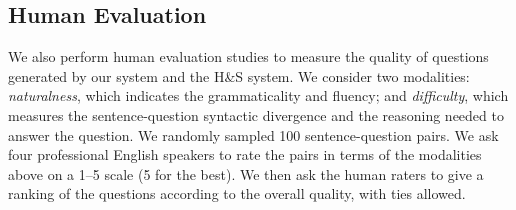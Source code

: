 \documentclass[11pt,a4paper]{article}
\begin{document}


\subsection{Human Evaluation}


We also perform human evaluation studies to measure the quality of questions generated by our system and the H\&S system. We consider two modalities: \emph{naturalness}, which indicates the grammaticality and fluency; and \emph{difficulty}, which measures the sentence-question syntactic divergence and the reasoning needed to answer the question. We randomly sampled 100 sentence-question pairs. We ask four professional English speakers to rate the pairs in terms of the modalities above on a 1--5 scale (5 for the best). We then ask the human raters to give a ranking of the questions according to the overall quality, with ties allowed.

  
  


\end{document}
